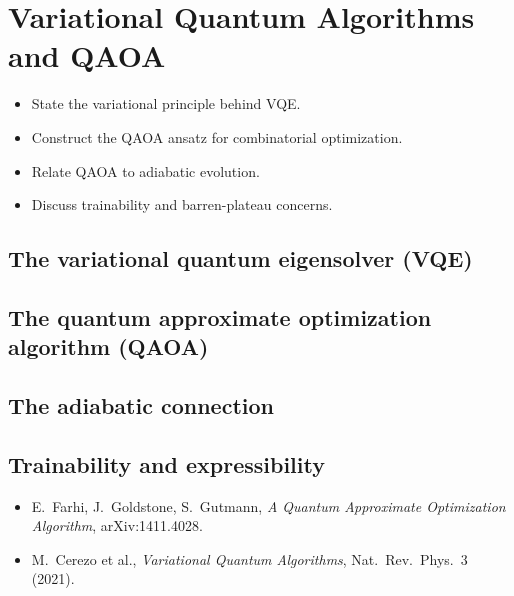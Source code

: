 \chapter{Variational Quantum Algorithms and QAOA}
\label{ch:lec18}

\begin{objectives}
\begin{itemize}[leftmargin=1.4em,nosep]
  \item State the variational principle behind VQE.
  \item Construct the QAOA ansatz for combinatorial optimization.
  \item Relate QAOA to adiabatic evolution.
  \item Discuss trainability and barren-plateau concerns.
\end{itemize}
\end{objectives}


\section{The variational quantum eigensolver (VQE)}
\label{sec:lec18-1}

\section{The quantum approximate optimization algorithm (QAOA)}
\label{sec:lec18-2}

\section{The adiabatic connection}
\label{sec:lec18-3}

\section{Trainability and expressibility}
\label{sec:lec18-4}

\exercisesection
\begin{exercise}
\end{exercise}
\begin{exercise}
\end{exercise}
\begin{exercise}
\end{exercise}

\readingsection
\begin{itemize}[leftmargin=1.4em]
  \item E.~Farhi, J.~Goldstone, S.~Gutmann, \emph{A Quantum Approximate Optimization Algorithm}, arXiv:1411.4028.
  \item M.~Cerezo et al., \emph{Variational Quantum Algorithms}, Nat.~Rev.~Phys.~3 (2021).
\end{itemize}
